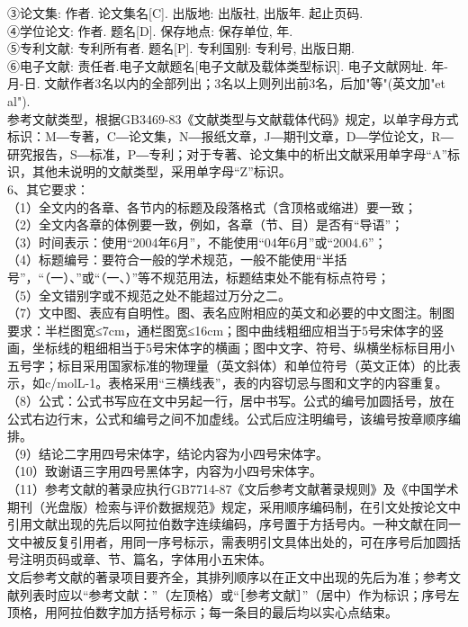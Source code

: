 \documentclass{xmuthesis}
\begin{document}
\begin{flushleft}
    ③论文集: 作者. 论文集名[C]. 出版地: 出版社, 出版年. 起止页码.\\
    ④学位论文: 作者. 题名[D]. 保存地点: 保存单位, 年.\\
    ⑤专利文献: 专利所有者. 题名[P]. 专利国别: 专利号, 出版日期.\\
    ⑥电子文献: 责任者.电子文献题名[电子文献及载体类型标识]. 电子文献网址. 年-月-日. 文献作者3名以内的全部列出；3名以上则列出前3名，后加"等"(英文加"et al").\\
    参考文献类型，根据GB3469-83《文献类型与文献载体代码》规定，以单字母方式标识：M―专著，C―论文集，N―报纸文章，J―期刊文章，D―学位论文，R―研究报告，S―标准，P―专利；对于专著、论文集中的析出文献采用单字母“A”标识，其他未说明的文献类型，采用单字母“Z”标识。\\
    6、其它要求：\\
   （1）全文内的各章、各节内的标题及段落格式（含顶格或缩进）要一致；\\
   （2）全文内各章的体例要一致，例如，各章（节、目）是否有“导语”；\\
   （3）时间表示：使用“2004年6月”，不能使用“04年6月”或“2004.6”；\\
   （4）标题编号：要符合一般的学术规范，一般不能使用“半括号”，“（一）、”或“（一、）”等不规范用法，标题结束处不能有标点符号；\\
   （5）全文错别字或不规范之处不能超过万分之二。\\
（7）文中图、表应有自明性。图、表名应附相应的英文和必要的中文图注。制图要求：半栏图宽≤7cm，通栏图宽≤16cm；图中曲线粗细应相当于5号宋体字的竖画，坐标线的粗细相当于5号宋体字的横画；图中文字、符号、纵横坐标标目用小五号字；标目采用国家标准的物理量（英文斜体）和单位符号（英文正体）的比表示，如c/molL-1。表格采用“三横线表”，表的内容切忌与图和文字的内容重复。\\
   （8）公式：公式书写应在文中另起一行，居中书写。公式的编号加圆括号，放在公式右边行末，公式和编号之间不加虚线。公式后应注明编号，该编号按章顺序编排。\\
（9）结论二字用四号宋体字，结论内容为小四号宋体字。\\
（10）致谢语三字用四号黑体字，内容为小四号宋体字。\\
   （11）参考文献的著录应执行GB7714-87《文后参考文献著录规则》及《中国学术期刊（光盘版）检索与评价数据规范》规定，采用顺序编码制，在引文处按论文中引用文献出现的先后以阿拉伯数字连续编码，序号置于方括号内。一种文献在同一文中被反复引用者，用同一序号标示，需表明引文具体出处的，可在序号后加圆括号注明页码或章、节、篇名，字体用小五宋体。\\
文后参考文献的著录项目要齐全，其排列顺序以在正文中出现的先后为准；参考文献列表时应以“参考文献：”（左顶格）或“［参考文献］”（居中）作为标识；序号左顶格，用阿拉伯数字加方括号标示；每一条目的最后均以实心点结束。\\

\end{flushleft}
\end{document}
